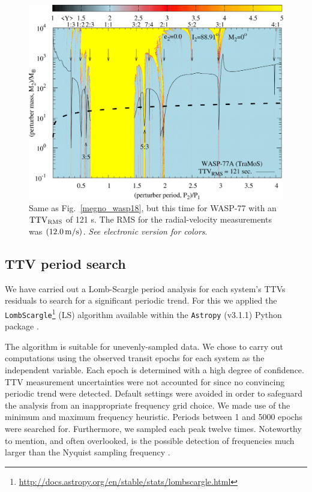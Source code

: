 \begin{figure}
\includegraphics[width=1.0\columnwidth]{imagenes/WASP77_TraMos_121sec_Map001_GIMP_scaled.png}
\caption{Same as Fig.~\ref{megno_wasp18}, but this time for WASP-77 with an $\rm TTV_{\rm RMS}$ of 121 s. The RMS for the radial-velocity measurements was $(12.0\,\rm m/s)$.
\emph{See electronic version for colors}.}
\label{megno_wasp77}
\end{figure}

\subsection{TTV period search}

We have carried out a Lomb-Scargle period analysis \citep{Lomb1976, Scargle1982} for each system's TTVs residuals to search for a significant periodic trend. For this we applied the \texttt{LombScargle}\footnote{\url{http://docs.astropy.org/en/stable/stats/lombscargle.html}} (LS) algorithm available within the \texttt{Astropy} (v3.1.1) Python package \citep{2012cidu.conf...47V, 2015ApJ...812...18V}.

The algorithm is suitable for unevenly-sampled data. We chose to carry out computations using the observed transit epochs for each system as the independent variable. Each epoch is determined with a high degree of confidence. TTV measurement uncertainties were not accounted for since no convincing periodic trend were detected. Default settings were avoided in order to safeguard the analysis from an inappropriate frequency grid choice. We made use of the minimum and maximum frequency heuristic. Periods between 1 and 5000 epochs were searched for. Furthermore, we sampled each peak twelve times. Noteworthy to mention, and often overlooked, is the possible detection of frequencies much larger than the Nyquist sampling frequency \citep{2018ApJS..236...16V}. 

